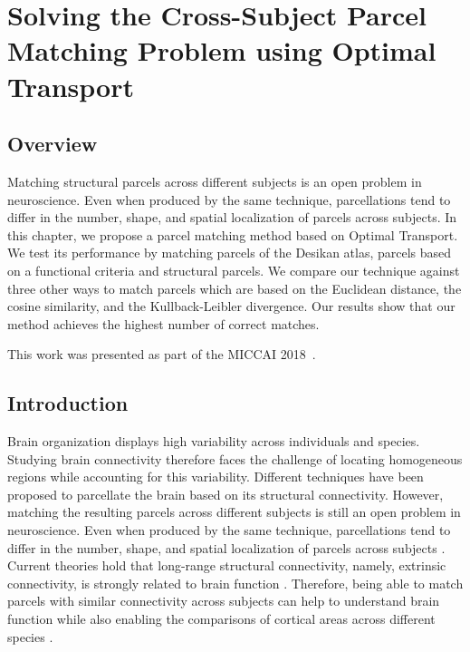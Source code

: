 \chapter{Solving the Cross-Subject Parcel Matching Problem using Optimal Transport}
\label{ch:matching}

\section{Overview}
Matching structural parcels across different subjects is an open problem in
neuroscience. Even when produced by the same technique, parcellations tend to
differ in the number, shape, and spatial localization of parcels across subjects.
In this chapter, we propose a parcel matching method based on Optimal Transport.
We test its performance by matching parcels of the Desikan atlas, parcels based
on a functional criteria and structural parcels. We compare our technique against
three other ways to match parcels which are based on the Euclidean distance, the
cosine similarity, and the Kullback-Leibler divergence. Our results show that
our method achieves the highest number of correct matches.

This work was presented as part of the MICCAI 2018~\cite{Gallardo2018}.

\section{Introduction}
Brain organization displays high variability across individuals and species.
Studying brain connectivity therefore faces the challenge of locating homogeneous
regions while accounting for this variability. Different techniques have been
proposed to parcellate the brain based on its structural connectivity. However,
matching the resulting parcels across different subjects is still an open
problem in neuroscience. Even when produced by the same technique, parcellations
tend to differ in the number, shape, and spatial localization of parcels across
subjects \cite{Jbabdi2013}. Current theories hold that long-range structural 
connectivity, namely, extrinsic connectivity, is strongly related to brain
function \cite{Passingham2002}. Therefore, being able to match parcels with
similar connectivity across subjects can help to understand brain function while
also enabling the comparisons of cortical areas across different
species \cite{Mars2018}.

